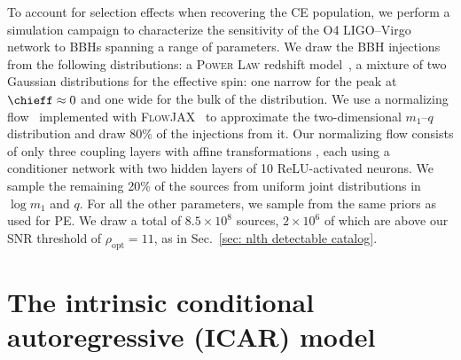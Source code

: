 \begin{refsection}
\begin{subappendices}
To account for selection effects when recovering the \ac{CE} population, we perform a simulation campaign to characterize the sensitivity of the O4 LIGO--Virgo network to \acp{BBH} spanning a range of parameters. We draw the \ac{BBH} injections from the following distributions: a \textsc{Power Law} redshift model~\citep{Fishbach:2018edt}, a mixture of two Gaussian distributions for the effective spin: one narrow for the peak at $\chieff\approx0$ and one wide for the bulk of the distribution. We use a normalizing flow~\citep{Papamakarios:2019fms, Kobyzev:2019ydm} implemented with \textsc{FlowJAX}~\citep{ward2023flowjax} to approximate the two-dimensional $m_1$--$q$ distribution and draw 80\% of the injections from it. Our normalizing flow consists of only three coupling layers with affine transformations \citep{dinh2016density}, each using a conditioner network with two hidden layers of 10 ReLU-activated neurons. We sample the remaining 20\% of the sources from uniform joint distributions in $\log{m_1}$ and $q$. For all the other parameters, we sample from the same priors as used for \ac{PE}. We draw a total of $8.5 \times 10^8$ sources, $2 \times 10^6$ of which are above our SNR threshold of $\rho_\mathrm{opt}=11$, as in Sec.~\ref{sec: nlth detectable catalog}.

\section{The intrinsic conditional autoregressive (ICAR) model}
\label{sec: nlth appICAR}


\end{subappendices}
\end{refsection}
